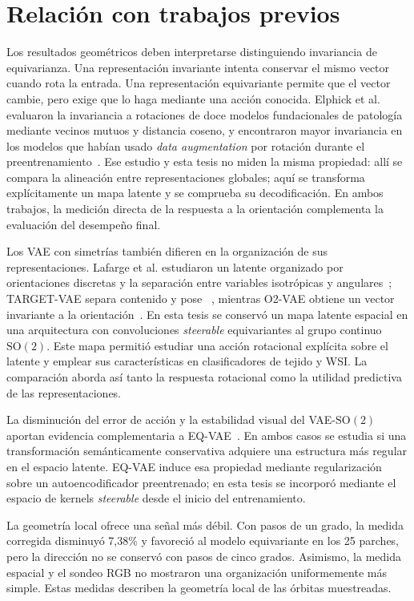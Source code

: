 \section{Relación con trabajos previos}

Los resultados geométricos deben interpretarse distinguiendo invariancia de
equivarianza. Una representación invariante intenta conservar el mismo vector
cuando rota la entrada. Una representación equivariante permite que el vector
cambie, pero exige que lo haga mediante una acción conocida. Elphick et al.
evaluaron la invariancia a rotaciones de doce modelos fundacionales de
patología mediante vecinos mutuos y distancia coseno, y encontraron mayor
invariancia en los modelos que habían usado \emph{data augmentation} por rotación durante el
preentrenamiento~\cite{elphick_rotation_2024}. Ese estudio y esta tesis no
miden la misma propiedad: allí se compara la alineación entre representaciones
globales; aquí se transforma explícitamente un mapa latente y se comprueba su
decodificación. En ambos trabajos, la medición directa de la respuesta a la
orientación complementa la evaluación del desempeño final.

Los VAE con simetrías también difieren en la organización de sus
representaciones. Lafarge et al. estudiaron un latente organizado por
orientaciones discretas y la separación entre variables isotrópicas y
angulares~\cite{lafarge_orientation_2020}; TARGET-VAE separa contenido y pose
~\cite{nasiri_target_2022}, mientras O2-VAE obtiene un vector invariante a la
orientación~\cite{burgess_orientation_2024}. En esta tesis se conservó un mapa
latente espacial en una arquitectura con convoluciones \emph{steerable}
equivariantes al grupo continuo \(\mathrm{SO}(2)\). Este mapa permitió
estudiar una acción rotacional explícita sobre el latente y emplear sus
características en clasificadores de tejido y WSI. La comparación aborda así
tanto la respuesta rotacional como la utilidad predictiva de las
representaciones.

La disminución del error de acción y la estabilidad visual del
VAE-\(\mathrm{SO}(2)\) aportan evidencia complementaria a
EQ-VAE~\cite{kouzelis_eqvae_2025}. En ambos casos se estudia si una transformación
semánticamente conservativa adquiere una estructura más regular en el espacio
latente. EQ-VAE induce esa propiedad mediante regularización sobre un
autoencodificador preentrenado; en esta tesis se incorporó mediante el espacio
de kernels \emph{steerable} desde el inicio del entrenamiento.

La geometría local ofrece una señal más débil. Con pasos de un grado, la medida
corregida disminuyó 7,38\% y favoreció al modelo equivariante en los 25 parches,
pero la dirección no se conservó con pasos de cinco grados. Asimismo, la medida espacial y el sondeo RGB no mostraron
una organización uniformemente más simple. Estas medidas describen la geometría local de las órbitas muestreadas.

